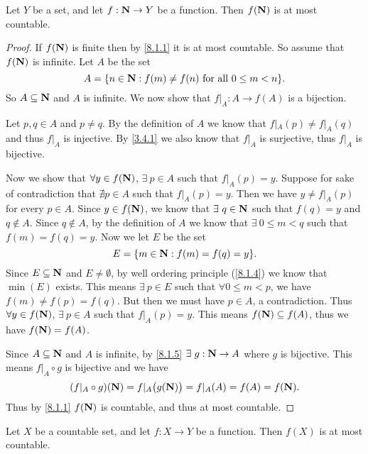 \begin{proposition}\label{8.1.8}
  Let \(Y\) be a set, and let \(f : \mathbf{N} \to Y\) be a function.
  Then \(f(\mathbf{N})\) is at most countable.
\end{proposition}

\begin{proof}
  If \(f(\mathbf{N})\) is finite then by \cref{8.1.1} it is at most countable.
  So assume that \(f(\mathbf{N})\) is infinite.
  Let \(A\) be the set
  \[
    A = \{n \in \mathbf{N} : f(m) \neq f(n) \text{ for all } 0 \leq m < n\}.
  \]
  So \(A \subseteq \mathbf{N}\) and \(A\) is infinite.
  We now show that \(f|_A : A \to f(A)\) is a bijection.

  Let \(p, q \in A\) and \(p \neq q\).
  By the definition of \(A\) we know that \(f|_A(p) \neq f|_A(q)\) and thus \(f|_A\) is injective.
  By \cref{3.4.1} we also know that \(f|_A\) is surjective, thus \(f|_A\) is bijective.

  Now we show that \(\forall y \in f(\mathbf{N})\), \(\exists\ p \in A\) such that \(f|_A(p) = y\).
  Suppose for sake of contradiction that \(\nexists p \in A\) such that \(f|_A(p) = y\).
  Then we have \(y \neq f|_A(p)\) for every \(p \in A\).
  Since \(y \in f(\mathbf{N})\), we know that \(\exists\ q \in \mathbf{N}\) such that \(f(q) = y\) and \(q \notin A\).
  Since \(q \notin A\), by the definition of \(A\) we know that \(\exists\ 0 \leq m < q\) such that \(f(m) = f(q) = y\).
  Now we let \(E\) be the set
  \[
    E = \{m \in \mathbf{N} : f(m) = f(q) = y\}.
  \]
  Since \(E \subseteq \mathbf{N}\) and \(E \neq \emptyset\), by well ordering principle (\cref{8.1.4}) we know that \(\min(E)\) exists.
  This means \(\exists\ p \in E\) such that \(\forall 0 \leq m < p\), we have \(f(m) \neq f(p) = f(q)\).
  But then we must have \(p \in A\), a contradiction.
  Thus \(\forall y \in f(\mathbf{N})\), \(\exists\ p \in A\) such that \(f|_A(p) = y\).
  This means \(f(\mathbf{N}) \subseteq f(A)\), thus we have \(f(\mathbf{N}) = f(A)\).

  Since \(A \subseteq \mathbf{N}\) and \(A\) is infinite, by \cref{8.1.5} \(\exists\ g : \mathbf{N} \to A\) where \(g\) is bijective.
  This means \(f|_A \circ g\) is bijective and we have
  \[
    (f|_A \circ g)(\mathbf{N}) = f|_A\big(g(\mathbf{N})\big) = f|_A(A) = f(A) = f(\mathbf{N}).
  \]
  Thus by \cref{8.1.1} \(f(\mathbf{N})\) is countable, and thus at most countable.
\end{proof}

\begin{corollary}\label{8.1.9}
  Let \(X\) be a countable set, and let \(f : X \to Y\) be a function.
  Then \(f(X)\) is at most countable.
\end{corollary}

